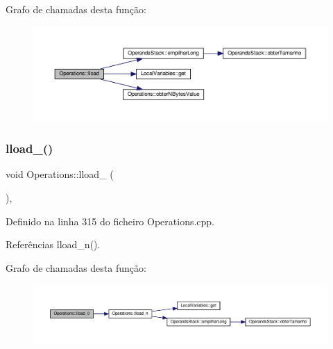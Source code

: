 Grafo de chamadas desta função\+:\nopagebreak
\begin{figure}[H]
\begin{center}
\leavevmode
\includegraphics[width=350pt]{classOperations_abd9d44b782cc5ae7d7985a424a0985c6_cgraph}
\end{center}
\end{figure}
\mbox{\label{classOperations_a556b64c0764f7a654a30540eb355aab3}} 
\subsubsection{\texorpdfstring{lload\+\_()}{lload\_0()}}
{\footnotesize\ttfamily void Operations\+::lload\+\_ (\begin{DoxyParamCaption}{ }\end{DoxyParamCaption})\hspace{0.3cm}{\ttfamily [static]}, {\ttfamily [private]}}



Definido na linha 315 do ficheiro Operations.\+cpp.



Referências lload\+\_\+n().

Grafo de chamadas desta função\+:\nopagebreak
\begin{figure}[H]
\begin{center}
\leavevmode
\includegraphics[width=350pt]{classOperations_a556b64c0764f7a654a30540eb355aab3_cgraph}
\end{center}
\end{figure}
\mbox{\label{classOperations_a34e91f6520ca574abce6b2b30ce91948}} 
